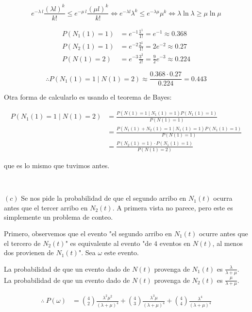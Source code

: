 \documentclass[a4paper, 12pt]{article}
\begin{document}
\begin{equation*}
  e^{-\lambda ~ l} \frac{( \lambda l)^k}{k!} \leq e^{- \mu ~ l} \frac{( \mu l )^k}{k!} \iff
  e^{-\lambda l} \lambda^k \leq e^{-\lambda \mu} \mu^k \iff \lambda  \ln
  \lambda \geq \mu  \ln \mu
\end{equation*}

\begin{align*}
  P(N_1(1) = 1) &= e^{-1} \frac{1^1}{1!} = e^{-1} \approx 0.368 \\ 
  P(N_2(1) = 1)&= e^{-2} \frac{2^1}{1!} = 2e^{-2} \approx 0.27\\ 
  P(N(1) = 2) &= e^{-3} \frac{3^2}{2!} = \frac{9}{2}e^{-3} \approx 0.224
\end{align*}

\begin{equation*}
  \therefore P(N_1(1) = 1 \mid N(1) = 2) \approx \frac{0.368 \cdot 0.27}{0.224}
  = 0.443
\end{equation*}

Otra forma de calcularlo es usando el teorema de Bayes:

\begin{align*}
  P(N_1(1) = 1 \mid N(1) = 2) 
  &= \frac{P(N(1) = 1 \mid N_1(1) = 1) P(N_1(1) =
  1)}{P(N(1) = 1)} \\ 
  &= \frac{P(N_1(1) + N_2(1) = 1 \mid N_1(1) = 1) P(N_1(1) = 1)}{P(N(1) = 1)} \\ 
  &=\frac{ P(N_2(1) = 1) \cdot P(N_1(1) = 1) }{P(N(1) = 2)}
\end{align*}

que es lo mismo que tuvimos antes.

~

$(c)$ Se nos pide la probabilidad de que el segundo arribo en $N_1(t)$ ocurra antes
que el tercer arribo en $N_2(t)$. A primera vista no parece, pero este es
simplemente un problema de conteo. 

Primero, observemos que el evento "el segundo arribo en $N_1(t)$ ocurre antes
que el tercero de $N_2(t)$" es equivalente al evento "de $4$ eventos en $N(t)$,
al menos dos provienen de $N_1(t)$". Sea $\omega$ este evento.

La probabilidad de que un evento dado de $N(t)$ provenga de $N_1(t)$ es
$\frac{\lambda}{\lambda + \mu}$. La probabilidad de que un evento dado de $N(t)$
provenga de $N_2(t)$ es $\frac{\mu}{\lambda + \mu}$.

\begin{align*}
  \therefore ~ P(\omega) 
  &= \binom{4}{2} \frac{\lambda^2\mu^2}{( \lambda + \mu
  )^4} + \binom{4}{3} \frac{\lambda^3 \mu}{(\lambda + \mu)^4} +
  \binom{4}{4}\frac{\lambda^4}{(\lambda+ \mu)^4}
\end{align*}
\end{document}
